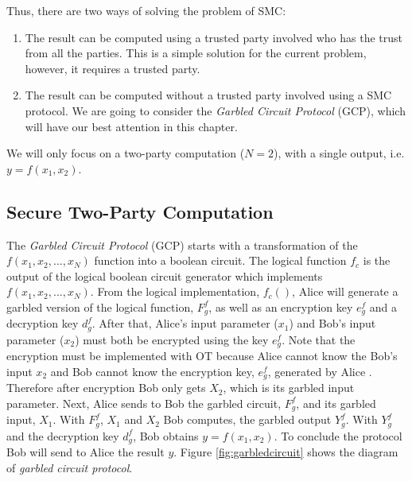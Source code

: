 \begin{refsection}
Thus, there are two ways of solving the problem of SMC:

\begin{enumerate}
  \item The result can be computed using a trusted party involved who has the trust from all the parties. This is a simple solution for the current problem, however, it requires a trusted party.
  \item The result can be computed without a trusted party involved using a SMC protocol. We are going to consider the \textit{Garbled Circuit Protocol} (GCP), which will have our best attention in this chapter.
\end{enumerate}

We will only focus on a two-party computation ($N=2$), with a single output, i.e. $y = f(x_1, x_2)$.

\subsection{Secure Two-Party Computation}

The \textit{Garbled Circuit Protocol} (GCP) starts with a transformation of the $f(x_1,x_2,...,x_N)$ function into a boolean circuit. The logical function $f_c$ is the output of the logical boolean circuit generator which implements $f(x_1,x_2,...,x_N)$. From the logical implementation, $f_c( )$, Alice will generate a garbled version of the logical function, $F_g^f$, as well as an encryption key $e_g^f$ and a decryption key $d_g^f$. After that, Alice's input parameter ($x_1$) and Bob's input parameter ($x_2$) must both be encrypted using the key $e_g^f$. Note that the encryption must be implemented with OT because Alice cannot know the Bob's input $x_2$ and Bob cannot know the encryption key, $e_g^f$, generated by Alice \cite{Naumann16}. Therefore after encryption Bob only gets $X_2$, which is its garbled input parameter. Next, Alice sends to Bob the garbled circuit, $F_g^f$, and its garbled input, $X_1$. With $F_g^f$, $X_1$ and $X_2$ Bob computes, the garbled output $Y_g^f$. With $Y_g^f$ and the decryption key $d_g^f$, Bob obtains $y=f(x_1,x_2)$. To conclude the protocol Bob will send to Alice the result $y$. Figure \ref{fig:garbledcircuit} shows the diagram of \textit{garbled circuit protocol}.


\end{refsection}
